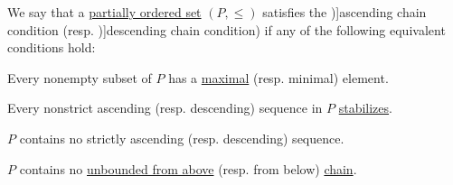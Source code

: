 \begin{definition}\label{def:chain_condition}
  We say that a \hyperref[def:partially_ordered_set]{partially ordered set} \( (P, \leq) \) satisfies the \term[en=ascending chain condition (\cite[def. 2.37(v)]{DaveyPriestley2002LatticeTheory})]{ascending chain condition} (resp. \term[en=ascending chain condition (\cite[def. 2.37(v)]{DaveyPriestley2002LatticeTheory})]{descending chain condition}) if any of the following equivalent conditions hold:
  \begin{thmenum}
     Every nonempty subset of \( P \) has a \hyperref[def:extremal_points/maximal_and_minimal_element]{maximal} (resp. minimal) element.

     Every nonstrict ascending (resp. descending) sequence in \( P \) \hyperref[def:stabilizing_sequence]{stabilizes}.

    \mimprovised \( P \) contains no strictly ascending (resp. descending) sequence.

    \mimprovised \( P \) contains no \hyperref[def:extremal_points/bounds]{unbounded from above} (resp. from below) \hyperref[def:partial_order_connectedness]{chain}.
  \end{thmenum}
\end{definition}
